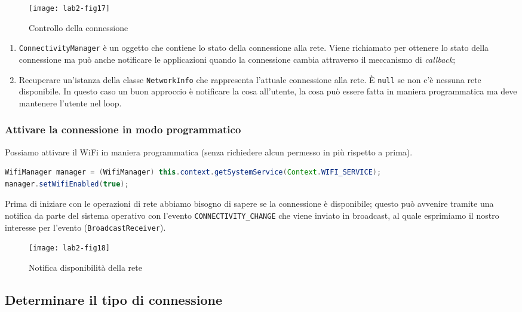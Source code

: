 \begin{figure*}[htbp]
	\centering
	\texttt{[image: lab2-fig17]}
	\caption[Controllo connessione]{Controllo della connessione}
	\label{img:lab2-fig17}
\end{figure*}

\begin{enumerate}
\item \texttt{ConnectivityManager} è un oggetto che contiene lo stato della connessione alla rete. Viene richiamato per ottenere lo stato della connessione ma può anche notificare le applicazioni quando la connessione cambia attraverso il meccanismo di \textit{callback};
\item Recuperare un'istanza della classe \texttt{NetworkInfo} che rappresenta l'attuale connessione alla rete. È \texttt{null} se non c'è nessuna rete disponibile. In questo caso un buon approccio è notificare la cosa all'utente, la cosa può essere fatta in maniera programmatica ma deve mantenere l'utente nel loop.
\end{enumerate}

\subsubsection{Attivare la connessione in modo programmatico}

Possiamo attivare il WiFi in maniera programmatica (senza richiedere alcun permesso in più rispetto a prima).

\begin{lstlisting}[language=Java, basicstyle=\footnotesize]
WifiManager manager = (WifiManager) this.context.getSystemService(Context.WIFI_SERVICE);
manager.setWifiEnabled(true);
\end{lstlisting}

Prima di iniziare con le operazioni di rete abbiamo bisogno di sapere se la connessione è disponibile; questo può avvenire tramite una notifica da parte del sistema operativo con l'evento \texttt{CONNECTIVITY\_CHANGE} che viene inviato in broadcast, al quale esprimiamo il nostro interesse per l'evento (\texttt{BroadcastReceiver}).

\begin{figure*}[htbp]
	\centering
	\texttt{[image: lab2-fig18]}
	\caption[Disponibilità rete]{Notifica disponibilità della rete}
	\label{img:lab2-fig18}
\end{figure*}

\subsection{Determinare il tipo di connessione}

